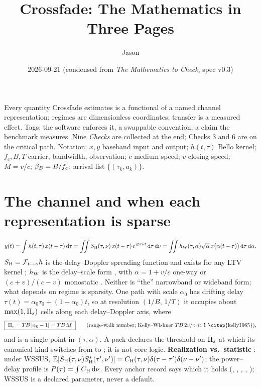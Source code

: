 \documentclass[10pt,a4paper]{article}
\title{\vspace{-14mm}Crossfade: The Mathematics in Three Pages}
\author{Jason}
\date{2026-09-21 \quad (condensed from \emph{The Mathematics to Check}, spec v0.3)}
\begin{document}
\maketitle
\vspace{-8mm}
\noindent\small Every quantity Crossfade estimates is a functional of a named channel representation; regimes are dimensionless coordinates; transfer is a measured effect. Tags: \tagG{} the software enforces it, \tagP{} a swappable convention, \tagH{} a claim the benchmark measures. Nine \emph{Checks} are collected at the end; Checks 3 and 6 are on the critical path. Notation: $x,y$ baseband input and output; $h(t,\tau)$ Bello kernel; $f_c,B,T$ carrier, bandwidth, observation; $c$ medium speed; $v$ closing speed; $M=v/c$; $\beta_{B}=B/f_c$; arrival list $\{(\tau_k,a_k)\}$.
\normalsize

\section{The channel and when each representation is sparse}
\vspace{-2pt}
\begin{equation}
  y(t)=\int h(t,\tau)\,x(t-\tau)\,\mathrm{d}\tau
  =\iint S_{\mathrm{H}}(\tau,\nu)\,x(t-\tau)\,\mathrm{e}^{\mathrm{j}2\pi\nu t}\,\mathrm{d}\tau\,\mathrm{d}\nu
  =\iint h_{\mathrm{W}}(\tau,\alpha)\sqrt{\alpha}\,x\big(\alpha(t-\tau)\big)\,\mathrm{d}\tau\,\mathrm{d}\alpha .
\end{equation}
$S_{\mathrm{H}}=\mathcal F_{t\to\nu}h$ is the delay--Doppler spreading function and exists for any LTV kernel \citep{bello1963,matz2013}; $h_{\mathrm{W}}$ is the delay--scale form \citep{altes1973}, with $\alpha=1+v/c$ one-way or $(c+v)/(c-v)$ monostatic \tagP{}. Neither is ``the'' narrowband or wideband form; what depends on regime is sparsity. One path with scale $\alpha_0$ has drifting delay $\tau(t)=\alpha_0\tau_0+(1-\alpha_0)t$, so at resolution $(1/B,\,1/T)$ it occupies about $\max(1,\Pi_{s})$ cells along each delay--Doppler axis, where
\begin{equation}
  \boxed{\ \Pis=TB\,|\alpha_0-1| = TB\,M\ }\qquad\text{(range-walk number; Kelly--Wishner $TB\,2v/c\ll1$ \citep{kelly1965})},
\end{equation}
and is a single point in $(\tau,\alpha)$. A pack declares the threshold on $\Pi_{s}$ at which its canonical kind switches from  to ; it is not core logic. \textbf{Realization vs.\ statistic} \tagG{}: under WSSUS, $\operatorname{\mathbb{E}}[S_{\mathrm{H}}(\tau,\nu)S_{\mathrm{H}}^\ast(\tau',\nu')]=C_{\mathrm{H}}(\tau,\nu)\delta(\tau-\tau')\delta(\nu-\nu')$; the power--delay profile is $P(\tau)=\int C_{\mathrm{H}}\,\mathrm{d}\nu$. Every anchor record says which it holds (, , , , ); WSSUS is a declared parameter, never a default.
\end{document}
